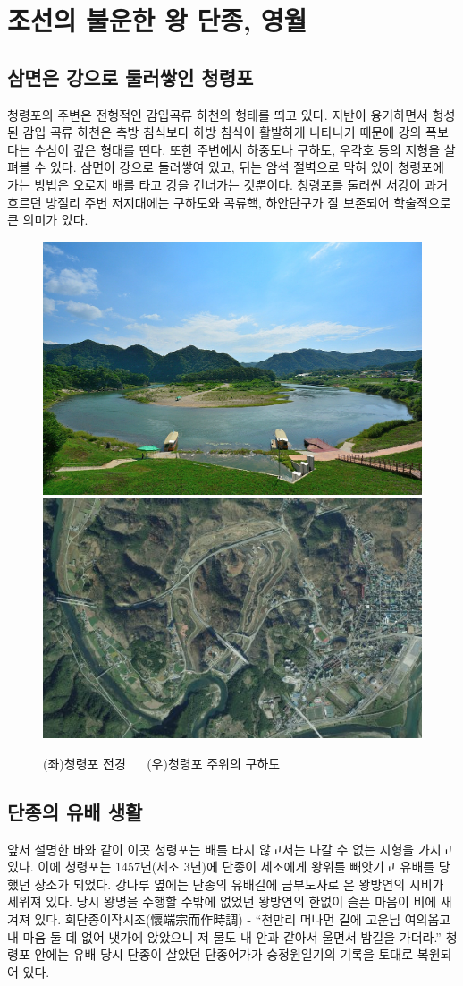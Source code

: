 \section{조선의 불운한 왕 단종, 영월}
\subsection{삼면은 강으로 둘러쌓인 청령포}
청령포의 주변은 전형적인 감입곡류 하천의 형태를 띄고 있다. 
지반이 융기하면서 형성된 감입 곡류 하천은 측방 침식보다 하방 침식이 활발하게 나타나기 때문에 강의 폭보다는 수심이 깊은 형태를 띤다. 
또한 주변에서 하중도나 구하도, 우각호 등의 지형을 살펴볼 수 있다. 삼면이 강으로 둘러쌓여 있고, 
뒤는 암석 절벽으로 막혀 있어 청령포에 가는 방법은 오로지 배를 타고 강을 건너가는 것뿐이다. 
청령포를 둘러싼 서강이 과거 흐르던 방절리 주변 저지대에는 구하도와 곡류핵, 하안단구가 잘 보존되어 학술적으로 큰 의미가 있다.


\begin{figure}[ht]
    \centering
    \includegraphics[width=.4\textwidth]{s_img/청령포_사진.jpeg}
    \includegraphics[width=.4\textwidth]{s_img/청령포_구하도.png}
    \caption{(좌)청령포 전경 $\quad$ (우)청령포 주위의 구하도\protect\footnotemark}
    \label{fig:my_label_s3}
 \end{figure}

 
\subsection{단종의 유배 생활}

앞서 설명한 바와 같이 이곳 청령포는 배를 타지 않고서는 나갈 수 없는 지형을 가지고 있다. 
이에 청령포는 1457년(세조 3년)에 단종이 세조에게 왕위를 빼앗기고 유배를 당했던 장소가 되었다. 
강나루 옆에는 단종의 유배길에 금부도사로 온 왕방연의 시비가 세워져 있다. 
당시 왕명을 수행할 수밖에 없었던 왕방연의 한없이 슬픈 마음이 비에 새겨져 있다. 
회단종이작시조(懷端宗而作時調) - ``천만리 머나먼 길에 고운님 여의옵고 내 마음 둘 데 없어 냇가에 앉았으니 저 물도 내 안과 같아서 울면서 밤길을 가더라.''
청령포 안에는 유배 당시 단종이 살았던 단종어가가 승정원일기의 기록을 토대로 복원되어 있다. 

